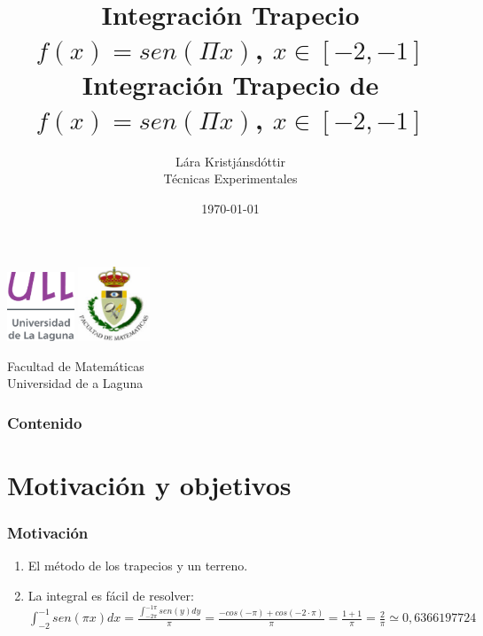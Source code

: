 \documentclass{beamer}
\title{Integración Trapecio \\ $f(x)=sen(\Pi x)$, $x \in [-2,-1]$}
\author{Lára Kristjánsdóttir \\ Técnicas Experimentales}
\date{\today}
\begin{document}
\begin{frame}
  \includegraphics[width=0.15\textwidth]{img/ullesc.eps}
  \hspace*{7.5cm}
  \includegraphics[width=0.16\textwidth]{img/fmatesc.eps}
  \titlepage
  \begin{scriptsize}
    \begin{center}
    \title{Integración Trapecio de $f(x)=sen(\Pi x)$, $x \in [-2,-1]$}
      Facultad de Matemáticas \\Universidad de a Laguna
    \end{center}
  \end{scriptsize}
\end{frame}

\begin{frame}
  \frametitle{Contenido}
  \tableofcontents
\end{frame}

\section{Motivación y objetivos}
\begin{frame}
  \frametitle{Motivación}
  \begin{enumerate}
    \item El método de los trapecios y un terreno.\\
    \pause
    \item La integral es fácil de resolver:\\
    $\int _{-2}^{-1} sen(\pi x) dx=\frac{\int _{-2 \pi}^{-1\pi}sen(y)dy}{\pi}=\frac{-cos(-\pi)+cos(-2 \cdot \pi)}{\pi}=\frac{1+1}{\pi}=\frac{2}{\pi}\simeq 0,6366197724$
  \end{enumerate}
\end{frame}
\end{document}
